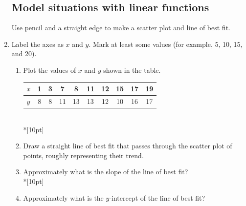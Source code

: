 \documentclass[12pt, oneside]{article}
\begin{document}
\begin{enumerate}
\subsection*{Model situations with linear functions}
  Use pencil and a straight edge to make a scatter plot and line of best fit.
  \item Label the axes as  $x$ and $y$. Mark at least some values (for example, 5, 10, 15, and 20).
  \begin{enumerate}
      \item Plot the values of $x$ and $y$ shown in the table.\\[5pt]
  	\begin{tabular}{|l|c|c|c|c|c|c|c|c|c|}
  	\hline
  	$x$ & 1 & 3 & 7 & 8 & 11 & 12 & 15 & 17 & 19\\
  	\hline
      $y$ & 8 & 8 & 11 & 13 & 13 & 12 & 10 & 16 & 17\\
  	\hline
  	\end{tabular}\\*[10pt]
  	\item Draw a straight line of best fit that passes through the scatter plot of points, roughly representing their trend.
  	\item Approximately what is the slope of the line of best fit?\\*[10pt]
  	\item Approximately what is the $y$-intercept of the line of best fit? \vspace{2cm}
  \end{enumerate}


\end{enumerate}
\end{document}
